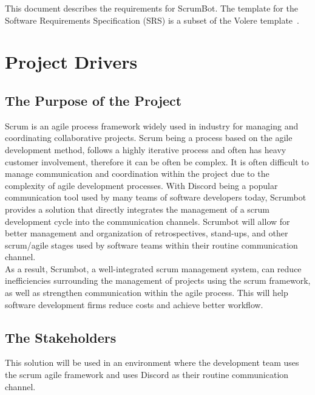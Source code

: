 \documentclass[12pt, titlepage]{article}
\begin{document}
\FloatBarrier

\newpage


This document describes the requirements for ScrumBot. The template for the Software Requirements Specification (SRS) is a subset of the Volere template~\citep{RobertsonAndRobertson2012}.

\section{Project Drivers}

\subsection{The Purpose of the Project}
Scrum is an agile process framework widely used in industry for managing and coordinating collaborative projects. Scrum being a process based on the agile development method, follows a highly iterative process and often has heavy customer involvement, therefore it can be often be complex. It is often difficult to manage communication and coordination within the project due to the complexity of agile development processes. With Discord being a popular communication tool used by many teams of software developers today, Scrumbot provides a solution that directly integrates the management of a scrum development cycle into the communication channels. Scrumbot will allow for better management and organization of retrospectives, stand-ups, and other scrum/agile stages used by software teams within their routine communication channel.\\

As a result, Scrumbot, a well-integrated scrum management system, can reduce inefficiencies surrounding the management of projects using the scrum framework, as well as strengthen communication within the agile process. This will help software development firms reduce costs and achieve better workflow.

\subsection{The Stakeholders}
This solution will be used in an environment where the development team uses the scrum agile framework and uses Discord as their routine communication channel.
\end{document}
